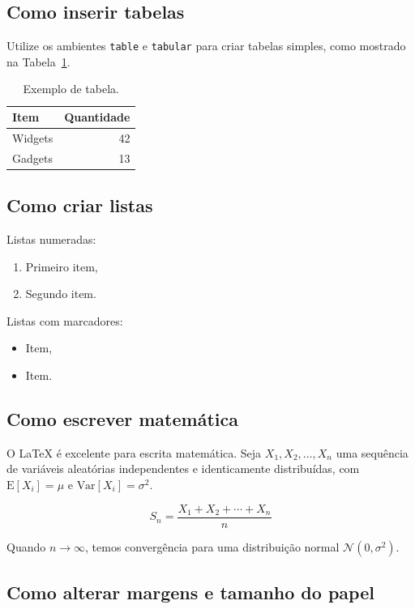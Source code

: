 \documentclass[12pt,oneside,a4paper,english,brazil]{abntex2}
\begin{document}
	\subsection{Como inserir tabelas}
	
	Utilize os ambientes \verb|table| e \verb|tabular| para criar tabelas simples, como mostrado na Tabela~\ref{tab:exemplo}.
	
	\begin{table}
		\centering
		\begin{tabular}{l|r}
			Item & Quantidade \\\hline
			Widgets & 42 \\
			Gadgets & 13
		\end{tabular}
		\caption{\label{tab:exemplo}Exemplo de tabela.}
	\end{table}
	
	\subsection{Como criar listas}
	
	Listas numeradas:
	
	\begin{enumerate}
		\item Primeiro item,
		\item Segundo item.
	\end{enumerate}
	
	Listas com marcadores:
	
	\begin{itemize}
		\item Item,
		\item Item.
	\end{itemize}
	
	\subsection{Como escrever matemática}
	
	O \LaTeX{} é excelente para escrita matemática. Seja $X_1, X_2, \ldots, X_n$ uma sequência de variáveis aleatórias independentes e identicamente distribuídas, com $\text{E}[X_i] = \mu$ e $\text{Var}[X_i] = \sigma^2$.
	
	\[
	S_n = \frac{X_1 + X_2 + \cdots + X_n}{n}
	\]
	
	Quando $n \to \infty$, temos convergência para uma distribuição normal $\mathcal{N}(0, \sigma^2)$.
	
	\subsection{Como alterar margens e tamanho do papel}
	
\end{document}
